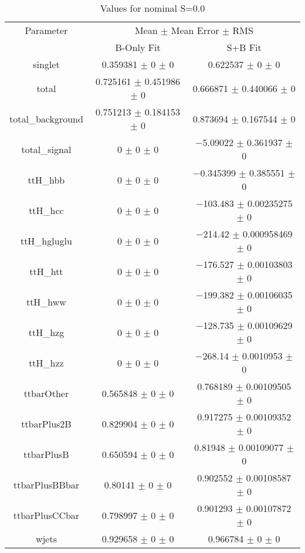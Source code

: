 \begin{table}
\centering
\caption{Values for nominal S=0.0}
\begin{tabular}{ccc}
\toprule
Parameter & \multicolumn{2}{c}{Mean $\pm$ Mean Error $\pm$ RMS}\\
 & B-Only Fit & S+B Fit\\
\midrule
singlet & \num{0.359381} $\pm$ \num{0} $\pm$ \num{0} & \num{0.622537} $\pm$ \num{0} $\pm$ \num{0}\\
total & \num{0.725161} $\pm$ \num{0.451986} $\pm$ \num{0} & \num{0.666871} $\pm$ \num{0.440066} $\pm$ \num{0}\\
total\_background & \num{0.751213} $\pm$ \num{0.184153} $\pm$ \num{0} & \num{0.873694} $\pm$ \num{0.167544} $\pm$ \num{0}\\
total\_signal & \num{0} $\pm$ \num{0} $\pm$ \num{0} & \num{-5.09022} $\pm$ \num{0.361937} $\pm$ \num{0}\\
ttH\_hbb & \num{0} $\pm$ \num{0} $\pm$ \num{0} & \num{-0.345399} $\pm$ \num{0.385551} $\pm$ \num{0}\\
ttH\_hcc & \num{0} $\pm$ \num{0} $\pm$ \num{0} & \num{-103.483} $\pm$ \num{0.00235275} $\pm$ \num{0}\\
ttH\_hgluglu & \num{0} $\pm$ \num{0} $\pm$ \num{0} & \num{-214.42} $\pm$ \num{0.000958469} $\pm$ \num{0}\\
ttH\_htt & \num{0} $\pm$ \num{0} $\pm$ \num{0} & \num{-176.527} $\pm$ \num{0.00103803} $\pm$ \num{0}\\
ttH\_hww & \num{0} $\pm$ \num{0} $\pm$ \num{0} & \num{-199.382} $\pm$ \num{0.00106035} $\pm$ \num{0}\\
ttH\_hzg & \num{0} $\pm$ \num{0} $\pm$ \num{0} & \num{-128.735} $\pm$ \num{0.00109629} $\pm$ \num{0}\\
ttH\_hzz & \num{0} $\pm$ \num{0} $\pm$ \num{0} & \num{-268.14} $\pm$ \num{0.0010953} $\pm$ \num{0}\\
ttbarOther & \num{0.565848} $\pm$ \num{0} $\pm$ \num{0} & \num{0.768189} $\pm$ \num{0.00109505} $\pm$ \num{0}\\
ttbarPlus2B & \num{0.829904} $\pm$ \num{0} $\pm$ \num{0} & \num{0.917275} $\pm$ \num{0.00109352} $\pm$ \num{0}\\
ttbarPlusB & \num{0.650594} $\pm$ \num{0} $\pm$ \num{0} & \num{0.81948} $\pm$ \num{0.00109077} $\pm$ \num{0}\\
ttbarPlusBBbar & \num{0.80141} $\pm$ \num{0} $\pm$ \num{0} & \num{0.902552} $\pm$ \num{0.00108587} $\pm$ \num{0}\\
ttbarPlusCCbar & \num{0.798997} $\pm$ \num{0} $\pm$ \num{0} & \num{0.901293} $\pm$ \num{0.00107872} $\pm$ \num{0}\\
wjets & \num{0.929658} $\pm$ \num{0} $\pm$ \num{0} & \num{0.966784} $\pm$ \num{0} $\pm$ \num{0}\\
\bottomrule
\end{tabular}
\end{table}